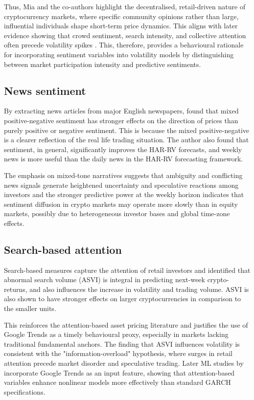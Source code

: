 \documentclass[12pt]{report}
\begin{document}
Thus, Mia and the co-authors highlight the decentralised, retail-driven nature of cryptocurrency markets, where specific community opinions rather than large, influential individuals shape short-term price dynamics. This aligns with later evidence showing that crowd sentiment, search intensity, and collective attention often precede volatility spikes \citep{wang2023cryptoML}. This, therefore, provides a behavioural rationale for incorporating sentiment variables into volatility models by distinguishing between market participation intensity and predictive sentiments.


\subsection{News sentiment}

By extracting news articles from major English newspapers, \cite{sapkota2022newsbitcoin} found that mixed positive-negative sentiment has stronger effects on the direction of prices than purely positive or negative sentiment. This is because the mixed positive-negative is a clearer reflection of the real life trading situation. The author also found that sentiment, in general, significantly improves the HAR-RV forecasts, and weekly news is more useful than the daily news in the HAR-RV forecasting framework.

The emphasis on mixed-tone narratives suggests that ambiguity and conflicting news signals generate heightened uncertainty and speculative reactions among investors and the stronger predictive power at the weekly horizon indicates that sentiment diffusion in crypto markets may operate more slowly than in equity markets, possibly due to heterogeneous investor bases and global time-zone effects.

\subsection{Search-based attention}

Search-based measures capture the attention of retail investors and
\cite{hoangvo2024googleattention} identified that abnormal search volume (ASVI) is integral in predicting next-week crypto-returns, and also influences the increase in volatility and trading volume. ASVI is also shown to have stronger effects on larger cryptocurrencies in comparison  to the smaller units.

This reinforces the attention-based asset pricing literature and justifies the use of Google Trends as a timely behavioural proxy, especially in markets lacking traditional fundamental anchors. The finding that ASVI influences volatility is consistent with the "information-overload" hypothesis, where surges in retail attention precede market disorder 
and speculative trading. Later ML studies by \citep{wang2023cryptoML} incorporate Google Trends as an input feature, showing that attention-based variables enhance nonlinear models more effectively than standard GARCH specifications.
\end{document}
